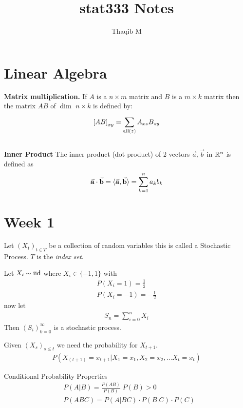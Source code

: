 \documentclass[12pt,a4paper]{article}
\author{Thaqib M}
\title{stat333 Notes}
\begin{document}
\maketitle
\newpage
\section*{Linear Algebra}
\textbf{Matrix multiplication.} If $A$ is a $n\times m$ matrix and $B$ is a $m\times k$ matrix then the matrix $AB$ of $\dim$ $n\times k$ is defined by: 
\begin{align*}
{\bf[}AB{\bf]}_{xy} = \sum\limits_{\mathrm{all}(z)}^{}A_{xz}B_{zy}
\end{align*}
\\
\textbf{Inner Product} The inner product (dot product) of 2 vectors $\vec{a}, \vec{b}$ in $\mathbb{R}^n$ is defined as
\begin{align*}
\va{a}\cdot \va{b} = \langle\va{a},\va{b}\rangle = \sum\limits_{k=1}^{n}a_kb_k
\end{align*}

\newpage
\section{Week 1}
\begin{defn}
Let $(X_t)_{t\in T}$ be a collection of random variables this is called a Stochastic Process. $T$ is the \textit{index set}. 
\end{defn}
\begin{example}
Let $X_i\thicksim \mathrm{iid}$ where $X_i \in \{-1,1\}$ with 
\begin{align*}
P(X_i = 1) = \frac{1}{2}\\
P(X_i = -1) = -\frac{1}{2}
\end{align*}
now let 
\begin{align*}
S_n = \sum_{i=0}^n X_i
\end{align*}
Then $(S_i)_{k=0}^\infty$ is a stochastic process.  
\end{example}

\begin{defn}
Given $(X_s)_{s \leq t}$ we need the probability for $X_{t+1}$.
\begin{align*}
P(X_{(t+1)} = x_{t+1} \vert X_1 = x_1 , X_2 = x_2, \ldots X_t = x_t)
\end{align*}
\end{defn}


\begin{note}{Conditional Probability Properties}
\begin{align*}
&P(A | B) = \frac{P(AB)}{P(B)} \; P(B) > 0\\
&P(ABC) = P(A|BC) \cdot P(B|C) \cdot P(C)
\end{align*}
\end{note}
\end{document}
